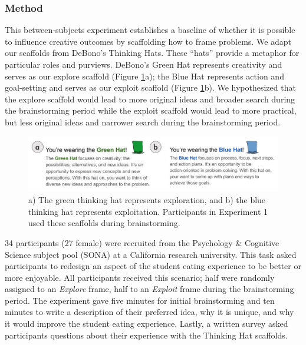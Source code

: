\subsubsection{Method}
This between-subjects experiment establishes a baseline of whether it is possible to influence creative outcomes by scaffolding how to frame problems. We adapt our scaffolds from DeBono's \cite{debono1985} Thinking Hats. These ``hats'' provide a metaphor for particular roles and purviews. DeBono's Green Hat represents creativity and serves as our explore scaffold (Figure \ref{fig:hats}a); the Blue Hat represents action and goal-setting and serves as our exploit scaffold (Figure \ref{fig:hats}b). We hypothesized that the explore scaffold would lead to more original ideas and broader search during the brainstorming period while the exploit scaffold would lead to more practical, but less original ideas and narrower search during the brainstorming period.

\begin{figure}
\centering
  \includegraphics[width=\textwidth]{future/figures/thinking_hats.jpg}
  \caption{a) The green thinking hat represents exploration, and b) the blue thinking hat represents exploitation. Participants in Experiment 1 used these scaffolds during brainstorming.
}
  \label{fig:hats}
\end{figure}

34 participants (27 female) were recruited from the Psychology \& Cognitive Science subject pool (SONA) at a California research university. This task asked participants to redesign an aspect of the student eating experience to be better or more enjoyable. All participants received this scenario; half were randomly assigned to an \textit{Explore} frame, half to an \textit{Exploit} frame during the brainstorming period. The experiment gave five minutes for initial brainstorming and ten minutes to write a description of their preferred idea, why it is unique, and why it would improve the student eating experience. Lastly, a written survey asked participants questions about their experience with the Thinking Hat scaffolds.

